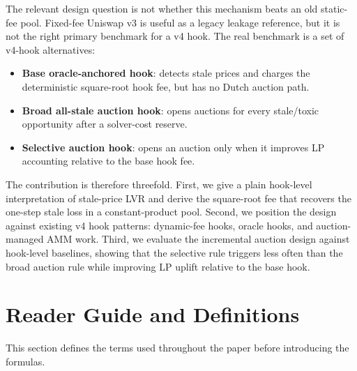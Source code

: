 \documentclass[11pt]{article}
\begin{document}
The relevant design question is not whether this mechanism beats an old static-fee pool. Fixed-fee Uniswap v3 is useful as a legacy leakage reference, but it is not the right primary benchmark for a v4 hook. The real benchmark is a set of v4-hook alternatives:
\begin{itemize}[leftmargin=0.25in]
\item \textbf{Base oracle-anchored hook}: detects stale prices and charges the deterministic square-root hook fee, but has no Dutch auction path.
\item \textbf{Broad all-stale auction hook}: opens auctions for every stale/toxic opportunity after a solver-cost reserve.
\item \textbf{Selective auction hook}: opens an auction only when it improves LP accounting relative to the base hook fee.
\end{itemize}

The contribution is therefore threefold. First, we give a plain hook-level interpretation of stale-price LVR and derive the square-root fee that recovers the one-step stale loss in a constant-product pool. Second, we position the design against existing v4 hook patterns: dynamic-fee hooks, oracle hooks, and auction-managed AMM work. Third, we evaluate the incremental auction design against hook-level baselines, showing that the selective rule triggers less often than the broad auction rule while improving LP uplift relative to the base hook.

\section{Reader Guide and Definitions}
This section defines the terms used throughout the paper before introducing the formulas.
\end{document}
